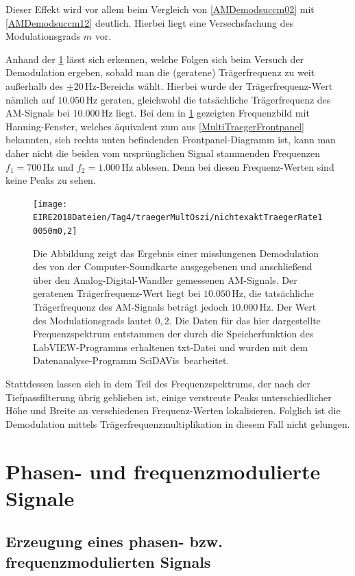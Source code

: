 \documentclass[
a4paper,
12pt,
pagesize,
ngerman
]{scrartcl}
\begin{document}
	\noindent Dieser Effekt wird vor allem beim Vergleich von \cref{AMDemodsuccm02} mit \cref{AMDemodsuccm12} deutlich. 
	Hierbei liegt eine Versechsfachung des Modulationsgrads $m$ vor.
	
	Anhand der \cref{AMDemodfailm02} lässt sich erkennen, welche Folgen sich beim Versuch der Demodulation ergeben, sobald man die (geratene) Trägerfrequenz zu weit außerhalb des $\pm 20\,$Hz-Bereichs wählt.
	Hierbei wurde der Trägerfrequenz-Wert nämlich auf $10.050\,$Hz geraten, gleichwohl die tatsächliche Trägerfrequenz des AM-Signals bei $10.000\,$Hz liegt.
	Bei dem in \cref{AMDemodfailm02} gezeigten Frequenzbild mit Hanning-Fenster, welches äquivalent zum aus \cref{MultiTraegerFrontpanel} bekannten, sich rechts unten befindenden Frontpanel-Diagramm ist, kann man daher nicht die beiden vom ursprünglichen Signal stammenden Frequenzen $f_1 = 700\,$Hz und $f_2 = 1.000\,$Hz ablesen.
	Denn bei diesen Frequenz-Werten sind keine Peaks zu sehen.
	
	\begin{figure}[H]
		\centering
		\texttt{[image: EIRE2018Dateien/Tag4/traegerMultOszi/nichtexaktTraegerRate10050m0,2]}
		\caption{Die Abbildung zeigt das Ergebnis einer misslungenen Demodulation des von der Computer-Soundkarte ausgegebenen und anschließend über den Analog-Digital-Wandler gemessenen AM-Signals. Der geratenen Trägerfrequenz-Wert liegt bei $10.050\,$Hz, die tatsächliche Trägerfrequenz des AM-Signals beträgt jedoch $10.000\,$Hz. Der Wert des Modulationsgrads lautet $0,2$. Die Daten für das hier dargestellte Frequenzspektrum entstammen der durch die Speicherfunktion des LabVIEW-Programms erhaltenen txt-Datei und wurden mit dem Datenanalyse-Programm \glqq SciDAVis\grqq\ bearbeitet.}
		\label{AMDemodfailm02}
	\end{figure}

	\noindent Stattdessen lassen sich in dem Teil des Frequenzspektrums, der nach der Tiefpassfilterung übrig geblieben ist, einige verstreute Peaks unterschiedlicher Höhe und Breite an verschiedenen Frequenz-Werten lokalisieren.
	Folglich ist die Demodulation mittels Trägerfrequenzmultiplikation in diesem Fall nicht gelungen.
	
	\newpage
	
	
	\section{Phasen- und frequenzmodulierte Signale}

	\subsection{Erzeugung eines phasen- bzw. frequenzmodulierten Signals} \label{FMPMErzeugung} %
	
\end{document}
